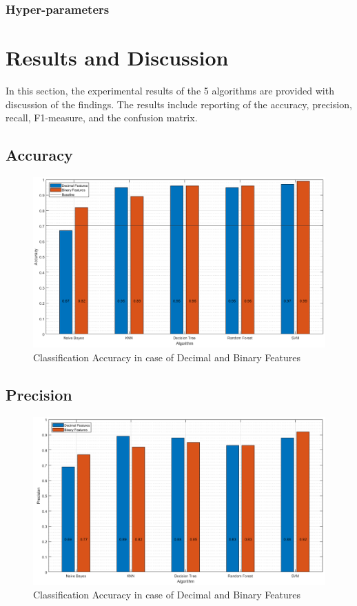 \documentclass{article}
\begin{document}
\subsubsection*{Hyper-parameters}


\newpage
\section{Results and Discussion}
In this section, the experimental results of the 5 algorithms are provided with discussion of the findings. The results include reporting of the accuracy, precision, recall, F1-measure, and the confusion matrix. 

\subsection{Accuracy}

\begin{figure}[H]
\centering
\includegraphics[width=\textwidth]{../Figures/accuracy.png}
\caption{Classification Accuracy in case of Decimal and Binary Features}
\end{figure}

\subsection{Precision}

\begin{figure}[H]
\centering
\includegraphics[width=\textwidth]{../Figures/precision.png}
\caption{Classification Accuracy in case of Decimal and Binary Features}
\end{figure}
\end{document}
